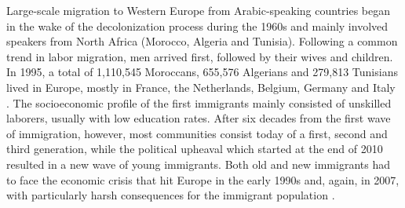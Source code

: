 \documentclass[output=paper]{langsci/langscibook}
\begin{document}
Large-scale migration to Western Europe from Arabic-speaking countries began in the wake of the decolonization process during the 1960s and mainly involved speakers from North Africa (Morocco, Algeria and Tunisia). Following a common trend in labor migration, men arrived first, followed by their wives and children. In 1995, a total of 1,110,545 Moroccans, 655,576 Algerians and 279,813 Tunisians lived in Europe, mostly in France, the Netherlands, Belgium, Germany and Italy \citep[259--260]{BoumansdeRuiter2002}. The socioeconomic profile of the first immigrants mainly consisted of unskilled laborers, usually with low education rates. After six decades from the first wave of immigration, however, most communities consist today of a first, second and third generation, while the political upheaval which started at the end of 2010 resulted in a new wave of young immigrants. Both old and new immigrants had to face the economic crisis that hit Europe in the early 1990s and, again, in 2007, with particularly harsh consequences for the immigrant population \citep[261]{BoumansdeRuiter2002}.
\end{document}
